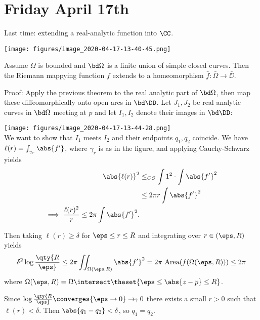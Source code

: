 \hypertarget{friday-april-17th}{%
\section{Friday April 17th}\label{friday-april-17th}}

Last time: extending a real-analytic function into \(\CC\).

\texttt{[image: figures/image\_2020-04-17-13-40-45.png]}\\

\begin{description}
\tightlist
\item[Theorem]
Assume \(\Omega\) is bounded and \(\bd \Omega\) is a finite union of
simple closed curves. Then the Riemann mappying function \(f\) extends
to a homeomorphism \(\bar f: \bar \Omega \to \bar \DD\).
\end{description}

Proof: Apply the previous theorem to the real analytic part of
\(\bd \Omega\), then map these diffeomorphically onto open arcs in
\(\bd \DD\). Let \(J_1, J_2\) be real analytic curves in \(\bd \Omega\)
meeting at \(p\) and let \(I_1, I_2\) denote their images in
\(\bd \DD\):

\texttt{[image: figures/image\_2020-04-17-13-44-28.png]}\\

We want to show that \(I_1\) meets \(I_2\) and their endpoints
\(q_1, q_2\) coincide. We have \(\ell(r) = \int_{\gamma_r} \abs{f'}\),
where \(\gamma_r\) is as in the figure, and applying Cauchy-Schwarz
yields \begin{align*}
\abs{\ell(r)}^2 
&\leq_{CS} \int 1^2 \cdot \int \abs{f'}^2 \\
&\leq 2\pi r \int \abs{f'}^2 \\
\implies {\ell(r)^2 \over r} \leq 2\pi \int \abs{f'}^2
.\end{align*}

Then taking \(\ell(r) \geq \delta\) for \(\eps \leq r \leq R\) and
integrating over \(r\in (\eps, R)\) yields \begin{align*}
\delta^2 \log\qty{R \over \eps} \leq 2\pi \iint_{\Omega(\eps, R)} \abs{f'}^2 = 2 \pi ~\mathrm{Area}(f(\Omega(\eps, R))) \leq 2\pi
\end{align*} where
\(\Omega(\eps, R) = \Omega \intersect \theset{\eps \leq \abs{z-p} \leq R}\).

Since \(\log\qty{R\over \eps} \converges{\eps\to 0}\to_? 0\) there
exists a small \(r>0\) such that \(\ell(r) < \delta\). Then
\(\abs{q_1 - q_2} < \delta\), so \(q_1 = q_2\).

